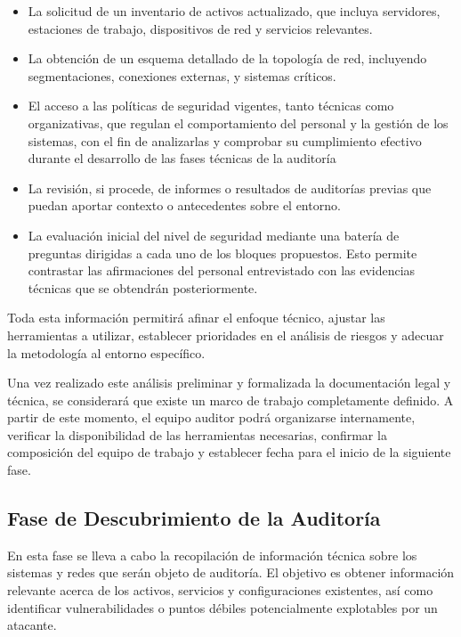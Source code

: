 \documentclass[a4paper, 11pt]{article}
\begin{document}
\begin{itemize}
\item La solicitud de un inventario de activos actualizado, que incluya servidores, estaciones de trabajo, dispositivos de red y servicios relevantes.
\item La obtención de un esquema detallado de la topología de red, incluyendo segmentaciones, conexiones externas, y sistemas críticos.
\item El acceso a las políticas de seguridad vigentes, tanto técnicas como organizativas, que regulan el comportamiento del personal y la gestión de los sistemas, con el fin de analizarlas y comprobar su cumplimiento
efectivo durante el desarrollo de las fases técnicas de la auditoría
\item La revisión, si procede, de informes o resultados de auditorías previas que puedan aportar contexto o antecedentes sobre el entorno.
\item La evaluación inicial del nivel de seguridad mediante una batería de preguntas dirigidas a cada uno de los bloques propuestos. Esto permite contrastar las afirmaciones del personal entrevistado con las evidencias técnicas que se obtendrán posteriormente.
\end{itemize}

Toda esta información permitirá afinar el enfoque técnico, ajustar las herramientas a utilizar, establecer prioridades en el análisis de riesgos y adecuar la metodología al entorno específico.

Una vez realizado este análisis preliminar y formalizada la documentación legal y técnica, se considerará que existe un marco de trabajo completamente definido. A partir de este momento, el equipo auditor podrá organizarse internamente, verificar la disponibilidad de las herramientas necesarias, confirmar la composición del equipo de trabajo y establecer fecha para el inicio de la siguiente fase.

\subsection{Fase de Descubrimiento de la Auditoría}

En esta fase se lleva a cabo la recopilación de información técnica sobre los sistemas y redes que serán objeto de auditoría. El objetivo es obtener información relevante acerca de los activos, servicios y configuraciones existentes, así como identificar vulnerabilidades o puntos débiles potencialmente explotables por un atacante.
\end{document}
